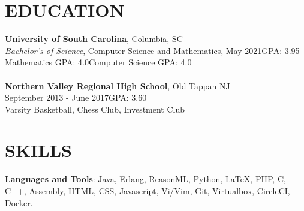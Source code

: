 \documentclass[margin]{res}
\begin{document}
\begin{resume}

\section{EDUCATION}
\textbf{University of South Carolina}, Columbia, SC\\
{\sl Bachelor's of Science}, Computer Science and Mathematics, May 2021\hfill GPA: 
3.95\\
Mathematics GPA: 4.0\hfill Computer Science GPA: 4.0\\\\
\textbf{Northern Valley Regional High School}, Old Tappan NJ\\
 September 2013 - June 2017\hfill GPA: 3.60\\
 Varsity Basketball, Chess Club, Investment Club


\section{SKILLS}

\textbf{Languages and Tools}: Java, Erlang, ReasonML, Python, \LaTeX, PHP, C, C++, Assembly, HTML, CSS, Javascript, Vi/Vim, Git, Virtualbox, CircleCI, Docker.
\\


\end{resume}
\end{document}
